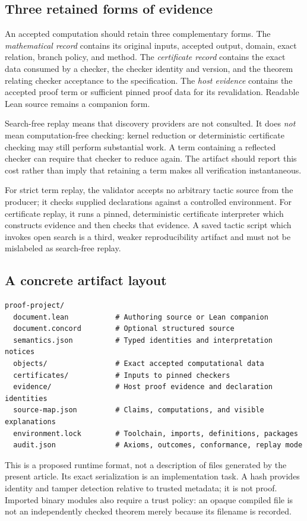 \documentclass[11pt,a4paper]{article}
\theoremstyle{remark}
\begin{document}
\subsection{Three retained forms of evidence}
An accepted computation should retain three complementary forms.
The \emph{mathematical record} contains its original inputs, accepted output,
domain, exact relation, branch policy, and method. The \emph{certificate record}
contains the exact data consumed by a checker, the checker identity and version,
and the theorem relating checker acceptance to the specification. The
\emph{host evidence} contains the accepted proof term or sufficient pinned
proof data for its revalidation. Readable Lean source remains a companion form.

Search-free replay means that discovery providers are not consulted. It does
\emph{not} mean computation-free checking: kernel reduction or deterministic
certificate checking may still perform substantial work. A term containing a
reflected checker can require that checker to reduce again. The artifact should
report this cost rather than imply that retaining a term makes all verification
instantaneous.

For strict term replay, the validator accepts no arbitrary tactic source from
the producer; it checks supplied declarations against a controlled environment.
For certificate replay, it runs a pinned, deterministic certificate interpreter
which constructs evidence and then checks that evidence. A saved tactic script
which invokes open search is a third, weaker reproducibility artifact and must
not be mislabeled as search-free replay.

\subsection{A concrete artifact layout}
\par\smallskip\noindent\begin{minipage}{\linewidth}
\begin{lstlisting}
proof-project/
  document.lean           # Authoring source or Lean companion
  document.concord        # Optional structured source
  semantics.json          # Typed identities and interpretation notices
  objects/                # Exact accepted computational data
  certificates/           # Inputs to pinned checkers
  evidence/               # Host proof evidence and declaration identities
  source-map.json         # Claims, computations, and visible explanations
  environment.lock        # Toolchain, imports, definitions, packages
  audit.json              # Axioms, outcomes, conformance, replay mode
\end{lstlisting}
\end{minipage}\par\smallskip
This is a proposed runtime format, not a description of files generated by the
present article. Its exact serialization is an implementation task. A hash
provides identity and tamper detection relative to trusted metadata; it is not
proof. Imported binary modules also require a trust policy: an opaque compiled
file is not an independently checked theorem merely because its filename is
recorded.
\end{document}
